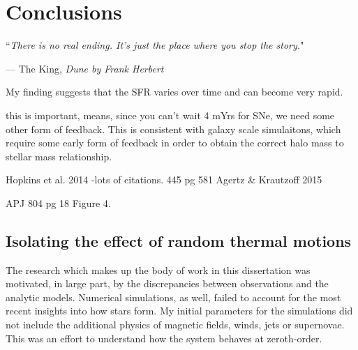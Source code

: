 \documentclass[../dissertation.tex]{subfiles}
\begin{document}
\chapter{Conclusions}
\label{ch:conclusions}

\singlespace
\epigraph{``\emph{There is no real ending. It's just the place where you stop the story.}"}{--- \textup{The King}, \textit{Dune by Frank Herbert}}

\dblspace

My finding suggests that the SFR varies over time and can become very rapid.

this is important, means, since you can't wait 4 mYrs for SNe, we need some other form of feedback.
This is consistent with galaxy scale simulaitons, which require some early form of feedback in order to obtain the correct halo mass to stellar mass relationship.

Hopkins et al. 2014  -lots of citations. 445 pg 581
Agertz \& Krautzoff 2015

APJ 804 pg 18 Figure 4. 
\section{Isolating the effect of random thermal motions}

The research which makes up the body of work in this dissertation was motivated, in large part, 
by the discrepancies between observations and the analytic models. 
Numerical simulations, as well, failed to account for the most recent insights into how stars form. 
My initial parameters for the simulations did not include the additional physics of magnetic fields, winds, jets or supernovae. 
This was an effort to understand how the system behaves at zeroth-order. 
\end{document}
